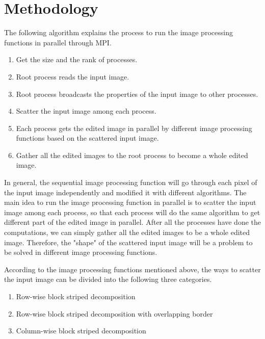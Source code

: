 \documentclass[12pt]{diazessay}
\begin{document}
\section*{Methodology}
The following algorithm explains the process to run the image processing functions in parallel through MPI.
\begin{enumerate}
    \item Get the size and the rank of processes.
    \item Root process reads the input image.
    \item Root process broadcasts the properties of the input image to other processes.
    \item Scatter the input image among each process.
    \item Each process gets the edited image in parallel by different image processing functions based on the scattered input image.
    \item Gather all the edited images to the root process to become a whole edited image.
\end{enumerate}
In general, the sequential image processing function will go through each pixel of the input image independently and modified it with different algorithms. The main idea to run the image processing function in parallel is to scatter the input image among each process, so that each process will do the same algorithm to get different part of the edited image in parallel. After all the processes have done the computations, we can simply gather all the edited images to be a whole edited image. Therefore, the "shape" of the scattered input image will be a problem to be solved in different image processing functions.

According to the image processing functions mentioned above, the ways to scatter the input image can be divided into the following three categories.
\begin{enumerate}
    \item Row-wise block striped decomposition
    \item Row-wise block striped decomposition with overlapping border
    \item Column-wise block striped decomposition
\end{enumerate}
\end{document}
